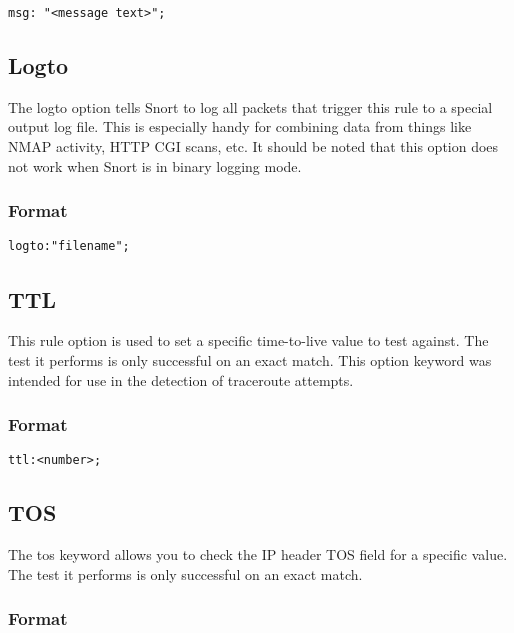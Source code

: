 \documentclass[english]{report}
\begin{document}
\begin{verbatim}
msg: "<message text>";
\end{verbatim}

\subsection{Logto}

The logto option tells Snort to log all packets that trigger this
rule to a special output log file. This is especially handy for combining
data from things like NMAP activity, HTTP CGI scans, etc. It should
be noted that this option does not work when Snort is in binary logging
mode.


\subsubsection{Format}

\begin{verbatim}
logto:"filename";
\end{verbatim}

\subsection{TTL}

This rule option is used to set a specific time-to-live value to test
against. The test it performs is only successful on an exact match.
This option keyword was intended for use in the detection of traceroute
attempts.


\subsubsection{Format}

\begin{verbatim}
ttl:<number>;
\end{verbatim}

\subsection{TOS}

The tos keyword allows you to check the IP header
TOS field for a specific value. The test it performs is only successful
on an exact match.


\subsubsection{Format}
\end{document}
